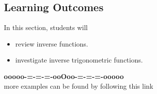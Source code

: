 \documentclass{ximera}
\begin{document}
\subsection*{Learning Outcomes}

\begin{sectionOutcomes}
In this section, students will 

\begin{itemize}
\item review inverse functions.
\item investigate inverse trigonometric functions.
\end{itemize}
\end{sectionOutcomes}













\begin{onlineOnly}
\begin{center}
\textbf{\textcolor{green!50!black}{ooooo-=-=-=-ooOoo-=-=-=-ooooo}} \\

more examples can be found by following this link\\ 

\end{center}
\end{onlineOnly}
\end{document}
